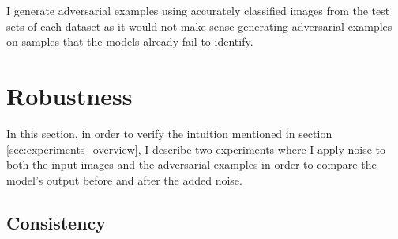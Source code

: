 I generate adversarial examples using accurately classified images from the test
sets of each dataset as it would not make sense generating adversarial examples
on samples that the models already fail to identify.

\section{Robustness}
\label{sec:robustness}

In this section, in order to verify the intuition mentioned in section
\ref{sec:experiments_overview}, I describe two experiments where I apply noise
to both the input images and the adversarial examples in order to compare the
model's output before and after the added noise.


\subsection{Consistency}
\label{sub:consistency}

